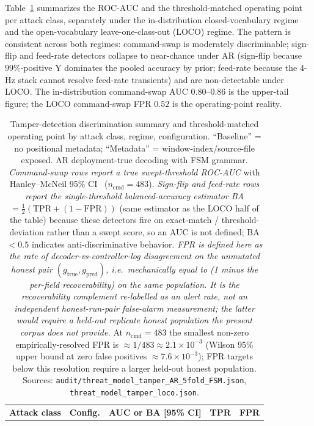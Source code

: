 \documentclass[sensors,article,submit,moreauthors,pdftex]{Definitions/mdpi}
\begin{document}
Table~\ref{tab:tamper_auc} summarizes the ROC-AUC and the threshold-matched operating point per attack class, separately under the in-distribution closed-vocabulary regime and the open-vocabulary leave-one-class-out (LOCO) regime. The pattern is consistent across both regimes: command-swap is moderately discriminable; sign-flip and feed-rate detectors collapse to near-chance under AR (sign-flip because $99\%$-positive Y dominates the pooled accuracy by prior; feed-rate because the 4-Hz stack cannot resolve feed-rate transients) and are non-detectable under LOCO. The in-distribution command-swap AUC $0.80$--$0.86$ is the upper-tail figure; the LOCO command-swap FPR $0.52$ is the operating-point reality.

\begin{table}[ht]
\centering
\caption{Tamper-detection discrimination summary and threshold-matched operating point by attack class, regime, configuration. ``Baseline'' = no positional metadata; ``Metadata'' = window-index/source-file exposed. AR deployment-true decoding with FSM grammar. \emph{Command-swap rows report a true swept-threshold ROC-AUC} with Hanley--McNeil 95\% CI~\cite{hanley1982meaning} ($n_{\text{cmd}}\!=\!483$). \emph{Sign-flip and feed-rate rows report the single-threshold balanced-accuracy estimator BA$=\!\tfrac{1}{2}(\mathrm{TPR}+(1-\mathrm{FPR}))$} (same estimator as the LOCO half of the table) because these detectors fire on exact-match / threshold-deviation rather than a swept score, so an AUC is not defined; BA $<\!0.5$ indicates anti-discriminative behavior. \emph{FPR is defined here as the rate of decoder-vs-controller-log disagreement on the unmutated honest pair $(g_{\text{true}}, g_{\text{pred}})$, i.e.\ mechanically equal to (1 minus the per-field recoverability) on the same population. It is the recoverability complement re-labelled as an alert rate, \emph{not} an independent honest-run-pair false-alarm measurement; the latter would require a held-out replicate honest population the present corpus does not provide.} At $n_{\text{cmd}}\!=\!483$ the smallest non-zero empirically-resolved FPR is $\approx\!1/483 \approx 2.1\!\times\!10^{-3}$ (Wilson 95\% upper bound at zero false positives $\approx\!7.6\!\times\!10^{-3}$); FPR targets below this resolution require a larger held-out honest population. Sources: \texttt{audit/threat\_model\_tamper\_AR\_5fold\_FSM.json}, \texttt{threat\_model\_tamper\_loco.json}.}
\label{tab:tamper_auc}
\small
\setlength{\tabcolsep}{4pt}
\begin{tabular}{l l c c c}
\toprule
\textbf{Attack class} & \textbf{Config.} & \textbf{AUC or BA [95\% CI]} & \textbf{TPR} & \textbf{FPR} \\

\end{tabular}
\end{table}
\end{document}
